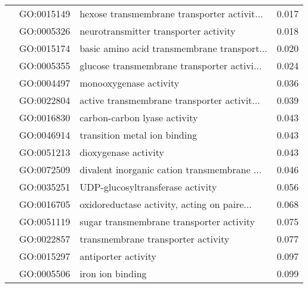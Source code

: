\begin{longtable}{lllr}
   & GO:0015149 &  hexose transmembrane transporter activit... &         0.017 \\
   & GO:0005326 &        neurotransmitter transporter activity &         0.018 \\
   & GO:0015174 &  basic amino acid transmembrane transport... &         0.020 \\
   & GO:0005355 &  glucose transmembrane transporter activi... &         0.024 \\
   & GO:0004497 &                       monooxygenase activity &         0.036 \\
   & GO:0022804 &  active transmembrane transporter activit... &         0.039 \\
   & GO:0016830 &                 carbon-carbon lyase activity &         0.043 \\
   & GO:0046914 &                 transition metal ion binding &         0.043 \\
   & GO:0051213 &                         dioxygenase activity &         0.043 \\
   & GO:0072509 &  divalent inorganic cation transmembrane ... &         0.046 \\
   & GO:0035251 &             UDP-glucosyltransferase activity &         0.056 \\
   & GO:0016705 &  oxidoreductase activity, acting on paire... &         0.068 \\
   & GO:0051119 &     sugar transmembrane transporter activity &         0.075 \\
   & GO:0022857 &           transmembrane transporter activity &         0.077 \\
   & GO:0015297 &                          antiporter activity &         0.097 \\
   & GO:0005506 &                             iron ion binding &         0.099 \\
\end{longtable}

